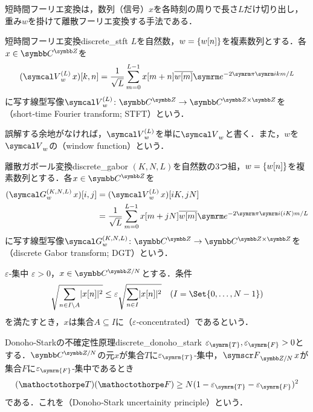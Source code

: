 \documentclass[../../main]{subfiles}
\begin{document}
短時間フーリエ変換は，数列（信号）\(x\)を各時刻の周りで長さ\(L\)だけ切り出し，重み\(w\)を掛けて離散フーリエ変換する手法である．

\begin{definition}{短時間フーリエ変換}{discrete_stft}
  \(L\)を自然数，\(w=\lbrace w[n]\rbrace\)を複素数列とする．各\(x\in\mapset{\numset{Z}}{\numset{C}}\)を
  \[
    (\stft[L]{w}x)[k,n] = \frac{1}{\sqrt{L}}\sum_{m=0}^{L-1}x[m+n]\conj*{w[m]}\napr^{-2\krez\iuni km/L}
  \]
  に写す線型写像\(\stft[L]{w}\colon\mapset{\numset{Z}}{\numset{C}}\to\mapset{\numset{Z}\times\numset{Z}}{\numset{C}}\)を（short‐time Fourier transform; STFT）という．
\end{definition}

誤解する余地がなければ，\(\stft[L]{w}\)を単に\(\stft{w}\)と書く．また，\(w\)を\(\stft{w}\)の（window function）という．

\begin{definition}{離散ガボール変換}{discrete_gabor}
  \((K,N,L)\)を自然数の3つ組，\(w=\lbrace w[n]\rbrace\)を複素数列とする．各\(x\in\mapset{\numset{Z}}{\numset{C}}\)を
  \begin{align*}
    (\dgt[K,N,L]{w}x)[i,j] &= (\stft[L]{w}x)[iK,jN] \\
    &= \frac{1}{\sqrt{L}}\sum_{m=0}^{L-1}x[m+jN]\conj*{w[m]}\napr^{-2\krez\iuni(iK)m/L}
  \end{align*}
  に写す線型写像\(\dgt[K,N,L]{w}\colon\mapset{\numset{Z}}{\numset{C}}\to\mapset{\numset{Z}\times\numset{Z}}{\numset{C}}\)を（discrete Gabor transform; DGT）という．
\end{definition}

\begin{definition}{\(\varepsilon\)‐集中}{}
  \(\varepsilon>0\)，\(x\in\cycles{\numset{C}}{N}\)とする．条件
  \[
    \sqrt{\sum_{n\in I\setminus A}\abs{x[n]}^2} \leq \varepsilon\sqrt{\sum_{n\in I}\abs{x[n]}^2}\quad(I=\Set{0,\dots,N-1})
  \]
  を満たすとき，\(x\)は集合\(A\subseteq I\)に（\(\varepsilon\)‐concentrated）であるという．
\end{definition}

\begin{theorem}{Donoho‐Starkの不確定性原理}{discrete_donoho_stark}
  \(\varepsilon_{\symrm{T}},\varepsilon_{\symrm{F}}>0\)とする．\(\cycles{\numset{C}}{N}\)の元\(x\)が集合\(T\)に\(\varepsilon_{\symrm{T}}\)‐集中，\(\dft{N}x\)が集合\(F\)に\(\varepsilon_{\symrm{F}}\)‐集中であるとき
  \[
    (\sizeof{T})(\sizeof{F}) \geq N(1-\varepsilon_{\symrm{T}}-\varepsilon_{\symrm{F}})^2
  \]
  である．これを（Donoho‐Stark uncertainity principle）という．
\end{theorem}
\end{document}
